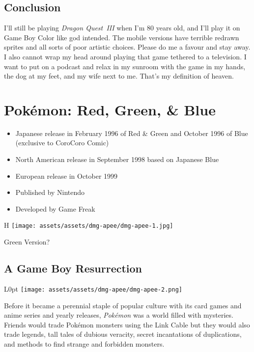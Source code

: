 \documentclass{book}
\begin{document}
\FloatBarrier\needspace{5pt}\section*{Conclusion}\nopagebreak[4]

I’ll still be playing \emph{Dragon Quest III} when I’m 80 years old, and I’ll play it on Game Boy Color like god intended. The mobile versions have terrible redrawn sprites and all sorts of poor artistic choices. Please do me a favour and stay away. I also cannot wrap my head around playing that game tethered to a television. I want to put on a podcast and relax in my sunroom with the game in my hands, the dog at my feet, and my wife next to me. That’s my definition of heaven.


\begingroup \chapter*{Pokémon: Red, Green, \& Blue} \endgroup

\begin{itemize} \setlength\itemsep{-0.4em}
\item Japanese release in February 1996 of Red \& Green and October 1996 of Blue (exclusive to CoroCoro Comic)
\item North American release in September 1998 based on Japanese Blue
\item European release in October 1999
\item Published by Nintendo
\item Developed by Game Freak
\end{itemize}\noindent

\begin{wrapfigure}{H}{\linewidth}
\vskip 4pt
\centering \texttt{[image: assets/assets/dmg-apee/dmg-apee-1.jpg]}\par\pagetwodescription Green Version?\end{wrapfigure}
\clearpage

\FloatBarrier\needspace{5pt}\section*{A Game Boy Resurrection}\nopagebreak[4]

\begin{wrapfigure}{L}{0pt} \texttt{[image: assets/assets/dmg-apee/dmg-apee-2.png]}\end{wrapfigure}
Before it became a perennial staple of popular culture with its card games and anime series and yearly releases, \emph{Pokémon} was a world filled with mysteries. Friends would trade Pokémon monsters using the Link Cable but they would also trade legends, tall tales of dubious veracity, secret incantations of duplications, and methods to find strange and forbidden monsters.
\end{document}
